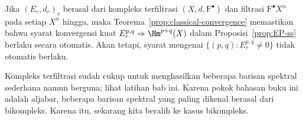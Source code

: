 Jika $(E_r,d_r)_r$ berasal dari kompleks terfiltrasi
$(X,d,\mathrm{F}^\bullet)$ dan filtrasi $\mathrm{F}^\bullet X^n$ pada setiap
$X^n$ hingga, maka Teorema~\ref{prop:classical-convergence} memastikan bahwa
syarat konvergensi kuat $E_r^{p,q}\Rightarrow\Hm^{p+q}(X)$ dalam
Proposisi~\ref{prop:EP-ss} berlaku secara otomatis. Akan tetapi, syarat
mengenai $\{(p,q):E_r^{p,q}\neq0\}$ tidak otomatis berlaku.

Kompleks terfiltrasi sudah cukup untuk menghasilkan beberapa barisan spektral
sederhana namun berguna; lihat latihan bab ini. Karena pokok bahasan buku ini
adalah aljabar, beberapa barisan spektral yang paling dikenal berasal dari
bikompleks. Karena itu, sekarang kita beralih ke kasus bikompleks.

